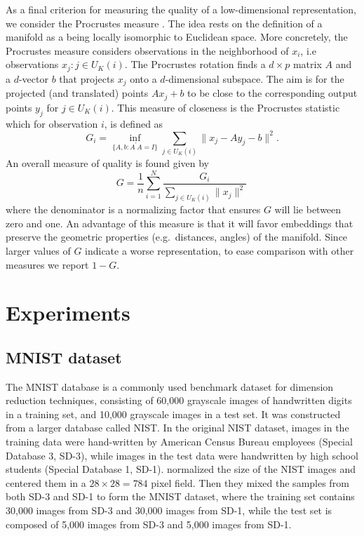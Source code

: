 \documentclass[11pt,a4paper,]{article}
\begin{document}
As a final criterion for measuring the quality of a low-dimensional representation, we consider the Procrustes measure \autocite{Goldberg2009-tb}. The idea rests on the definition of a manifold as a being locally isomorphic to Euclidean space. More concretely, the Procrustes measure considers observations in the neighborhood of \(x_i\), i.e observations \(x_j:j\in U_K(i)\). The Procrustes rotation finds a \(d\times p\) matrix \(A\) and a \(d\)-vector \(b\) that projects \(x_j\) onto a \(d\)-dimensional subspace. The aim is for the projected (and translated) points \(Ax_j+b\) to be close to the corresponding output points \(y_j\) for \(j\in U_K(i)\). This measure of closeness is the Procrustes statistic which for observation \(i\), is defined as
\begin{equation}\label{eq:procstats}
  G_i= \inf _{\{A,b: A^{\prime} A=I\}} \sum_{j\in U_K(i)}\|x_{j}-A y_{j}-b\|^{2}.
\end{equation}
An overall measure of quality is found given by
\begin{equation}\label{eq:procmeasure}
  G=\frac{1}{n}\sum\limits_{i=1}^N\frac{G_i}{\sum_{j\in U_K(i)}\|x_{j}\|^{2}}\,
\end{equation}
where the denominator is a normalizing factor that ensures \(G\) will lie between zero and one. An advantage of this measure is that it will favor embeddings that preserve the geometric properties (e.g.~distances, angles) of the manifold. Since larger values of \(G\) indicate a worse representation, to ease comparison with other measures we report \(1-G\).

\hypertarget{experiment}{%
\section{Experiments}\label{experiment}}

\hypertarget{mnist-dataset}{%
\subsection{MNIST dataset}\label{mnist-dataset}}

The MNIST database \autocite[Modified National Institute of Standards and Technology database;][]{lecun2010mnist} is a commonly used benchmark dataset for dimension reduction techniques, consisting of 60,000 grayscale images of handwritten digits in a training set, and 10,000 grayscale images in a test set. It was constructed from a larger database called NIST. In the original NIST dataset, images in the training data were hand-written by American Census Bureau employees (Special Database 3, SD-3), while images in the test data were handwritten by high school students (Special Database 1, SD-1). \textcite{lecun2010mnist} normalized the size of the NIST images and centered them in a \(28\times 28=784\) pixel field. Then they mixed the samples from both SD-3 and SD-1 to form the MNIST dataset, where the training set contains 30,000 images from SD-3 and 30,000 images from SD-1, while the test set is composed of 5,000 images from SD-3 and 5,000 images from SD-1.
\end{document}
